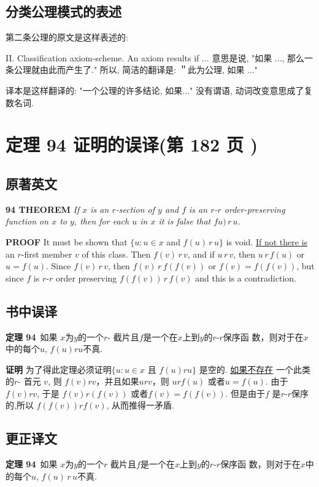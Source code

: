 \documentclass[zihao=-4,a4paper]{ctexart}
\begin{document}
\subsection{分类公理模式的表述}
第二条公理的原文是这样表述的:

II. Classification axiom-scheme. An axiom results if ... 意思是说, "如果 ...,
那么一条公理就由此而产生了." 所以, 简洁的翻译是: ＂此为公理, 如果 ..."
	
译本是这样翻译的: "一个公理的许多结论, 如果..." 没有谓语, 动词改变意思成了复数名词.




\section{定理 94 证明的误译(第 182 页 )}

\subsection{原著英文} 
{\bf 94 THEOREM} 
{\sl
	If $x$ is an $r$-section of $y$ and $f$ is an $r$-$r$ order-preserving function on $x$ to $y$, 
	then for each $u$ in $x$ it is false that $fu)\, r\, u$.
}

{\bf PROOF}
It must be shown that $\{u: u \in x $ and $ f(u) \, r\, u\}$ is void. 
\underline{If not there is} an $r$-first member $v$ of this class.
Then $f(v)\, r\, v $, and if $u\, r\, v$, then $u\, r\, f(u)$ or $u = f(u)$.
Since $f(v)\, r\, v$, then 
\underline{$f(v)\, r\, f(f(v))$}
or $f(v) = f(f(v))$, but since $f$ is $r$-$r$ order preserving
$f(f(v))\, r\, f(v)$ and this is a contradiction.

\subsection{书中误译} 
{\bf 定理 94}\,
{\kaishu
如果 $x$为$y$的一个$r$- 截片且$f$是一个在$x$上到$y$的$r$-$r$保序函
数，则对于在$x$中的每个$u$, $f(u)ru$不真.
}

{\bf 证明}
为了得此定理必须证明$\{u: u \in x $ 且 $ f(u) ru\}$ 是空的. 
\underline{如果不存在}\! 一个此类的$r$- 首元 $v$, 
则 $f(v) r  v $，并且如果$u r v$，则 $u r f(u)$
或者$u = f(u)$.
由于$f(v)rv$, 于是
\underline{$f(v)r(f(v))$}
或者$f(v)=f(f(v))$. 但是由于$f$ 是$r$-$r$保序的,所以
$f(f(v))rf(v)$, 从而推得一矛盾.

\subsection{更正译文} 
{\bf 定理 94}\,
{\kaishu
	如果 $x$为$y$的一个$r$ 截片且$f$是一个在$x$上到$y$的$r$-$r$保序函
	数，则对于在$x$中的每个$u$, $f(u)\, r\, u$不真.
}
\end{document}

